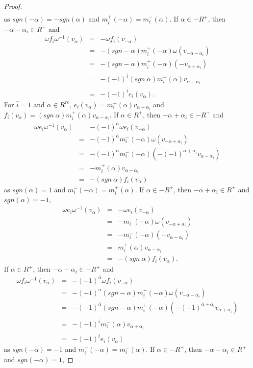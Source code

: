 \documentclass[11pt]{amsart}
\theoremstyle{plain}
\theoremstyle{definition}
\numberwithin{equation}{section}
\newcommand{\al}{\alpha}
\newcommand{\om}{\omega}
\begin{document}
\begin{proof}
\begin{eqnarray*}
		\end{eqnarray*}
		as $sgn(-\al)=-sgn(\al)$ and $m_i^+(-\al)=m_i^-(\al)$. If $\al\in-R^+$, then $-\al-\al_i\in R^+$ and 
		\begin{eqnarray*}
			\om f_i\om^{-1}(v_{\al})&=&-\om f_i(v_{-\al})\\&=&-(sgn-\al)m_i^+(-\al)\om(v_{-\al-\al_i})\\&=&-(sgn-\al)m_i^+(-\al)(-v_{\al+\al_i})\\&=&-(-1)^{\bar{i}}(sgn~\al)m_i^-(\al)v_{\al+\al_i}\\&=&-(-1)^{\bar{i}}e_i(v_{\al}).
		\end{eqnarray*}
		For $\bar{i}=1$ and $\al\in R^{re}$, $e_i(v_{\al})=m_i^-(\al)v_{\al+\al_i}$ and $f_i(v_{\al})=(sgn~\al)m_i^+(\al)v_{\al-\al_i}$.
		If $\al\in R^+$, then $-\al+\al_i\in-R^+$ and
		\begin{eqnarray*}
			\om e_i\om^{-1}(v_{\al})&=&-(-1)^{\bar{\al}}\om e_i(v_{-\al})\\&=&-(-1)^{\bar{\al}}m_i^-(-\al)\om(v_{-\al+\al_i})\\&=&-(-1)^{\bar{\al}}m_i^-(-\al)(-(-1)^{\bar{\al}+\bar{\al_i}}v_{\al-\al_i})\\&=&-m_i^+(\al)v_{\al-\al_i}\\&=&-(sgn~\al)f_i(v_{\al})
		\end{eqnarray*}
		as $sgn(\al)=1$ and $m_i^-(-\al)=m_i^+(\al)$. If $\al\in-R^+$, then $-\al+\al_i\in R^+$ and $sgn(\al)=-1$,
		\begin{eqnarray*}
			\om e_i\om^{-1}(v_{\al})&=&-\om e_i(v_{-\al})\\&=&-m_i^-(-\al)\om(v_{-\al+\al_i})\\&=&-m_i^-(-\al)(-v_{\al-\al_i})\\&=&m_i^+(\al)v_{\al-\al_i}\\&=&-(sgn~\al)f_i(v_{\al}).
		\end{eqnarray*}
		If $\al\in R^+$, then $-\al-\al_i\in-R^+$ and
		\begin{eqnarray*}
			\om f_i\om^{-1}(v_{\al})&=&-(-1)^{\bar{\al}}\om f_i(v_{-\al})\\&=&-(-1)^{\bar{\al}}(sgn-\al)m_i^+(-\al)\om(v_{-\al-\al_i})\\&=&-(-1)^{\bar{\al}}(sgn-\al)m_i^+(-\al)(-(-1)^{\bar{\al}+\bar{\al_i}}v_{\al+\al_i})\\&=&-(-1)^{\bar{i}}m_i^-(\al)v_{\al+\al_i}\\&=&-(-1)^{\bar{i}}e_i(v_{\al})
		\end{eqnarray*}
		as $sgn(-\al)=-1$ and $m_i^+(-\al)=m_i^-(\al)$. If $\al\in-R^+$, then $-\al-\al_i\in R^+$ and $sgn(-\al)=1$,

\end{proof}
\end{document}
